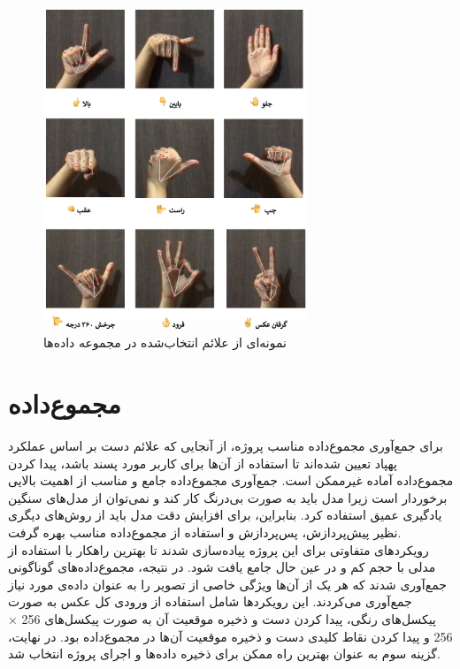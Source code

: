 \begin{figure}[h]
    \centering
    \includegraphics[width=0.7\textwidth]{gestures.png}
    \caption{نمونه‌ای از علائم انتخاب‌شده در مجموعه داده‌ها}
    \label{t}
\end{figure}

\section[مجموع‌داده]{مجموع‌داده \protect{}}
برای جمع‌آوری مجموع‌داده مناسب پروژه، از آنجایی که علائم دست بر اساس عملکرد پهپاد تعیین شده‌اند تا استفاده از آن‌ها برای کاربر مورد پسند باشد، پیدا کردن مجموع‌داده آماده غیرممکن است. جمع‌آوری مجموع‌داده جامع و مناسب از اهمیت
 بالایی برخوردار است زیرا مدل باید به صورت بی‌درنگ کار کند و نمی‌توان از مدل‌های سنگین یادگیری عمیق استفاده کرد. بنابراین، برای افزایش دقت مدل باید از روش‌های دیگری نظیر پیش‌پردازش، پس‌پردازش و استفاده از مجموع‌داده مناسب بهره گرفت.
\\
رویکردهای متفاوتی برای این پروژه پیاده‌سازی شدند تا بهترین راهکار با استفاده از مدلی با حجم کم و در عین حال جامع یافت شود. در نتیجه، مجموع‌داده‌های گوناگونی جمع‌آوری شدند که هر یک از آن‌ها ویژگی خاصی از تصویر
 را به عنوان داده‌ی مورد نیاز جمع‌آوری می‌کردند. این رویکردها شامل استفاده از ورودی کل عکس به صورت پیکسل‌های رنگی، پیدا کردن دست و ذخیره موقعیت آن به صورت پیکسل‌های 256 $\times$ 256 و پیدا کردن نقاط کلیدی دست و ذخیره موقعیت آن‌ها در مجموع‌داده بود. در نهایت، گزینه سوم به عنوان بهترین راه ممکن برای ذخیره داده‌ها و اجرای پروژه انتخاب شد.


